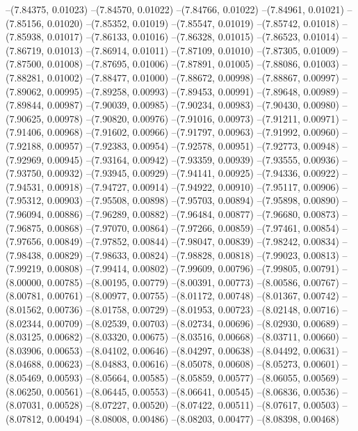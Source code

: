 --(7.84375, 0.01023)
--(7.84570, 0.01022)
--(7.84766, 0.01022)
--(7.84961, 0.01021)
--(7.85156, 0.01020)
--(7.85352, 0.01019)
--(7.85547, 0.01019)
--(7.85742, 0.01018)
--(7.85938, 0.01017)
--(7.86133, 0.01016)
--(7.86328, 0.01015)
--(7.86523, 0.01014)
--(7.86719, 0.01013)
--(7.86914, 0.01011)
--(7.87109, 0.01010)
--(7.87305, 0.01009)
--(7.87500, 0.01008)
--(7.87695, 0.01006)
--(7.87891, 0.01005)
--(7.88086, 0.01003)
--(7.88281, 0.01002)
--(7.88477, 0.01000)
--(7.88672, 0.00998)
--(7.88867, 0.00997)
--(7.89062, 0.00995)
--(7.89258, 0.00993)
--(7.89453, 0.00991)
--(7.89648, 0.00989)
--(7.89844, 0.00987)
--(7.90039, 0.00985)
--(7.90234, 0.00983)
--(7.90430, 0.00980)
--(7.90625, 0.00978)
--(7.90820, 0.00976)
--(7.91016, 0.00973)
--(7.91211, 0.00971)
--(7.91406, 0.00968)
--(7.91602, 0.00966)
--(7.91797, 0.00963)
--(7.91992, 0.00960)
--(7.92188, 0.00957)
--(7.92383, 0.00954)
--(7.92578, 0.00951)
--(7.92773, 0.00948)
--(7.92969, 0.00945)
--(7.93164, 0.00942)
--(7.93359, 0.00939)
--(7.93555, 0.00936)
--(7.93750, 0.00932)
--(7.93945, 0.00929)
--(7.94141, 0.00925)
--(7.94336, 0.00922)
--(7.94531, 0.00918)
--(7.94727, 0.00914)
--(7.94922, 0.00910)
--(7.95117, 0.00906)
--(7.95312, 0.00903)
--(7.95508, 0.00898)
--(7.95703, 0.00894)
--(7.95898, 0.00890)
--(7.96094, 0.00886)
--(7.96289, 0.00882)
--(7.96484, 0.00877)
--(7.96680, 0.00873)
--(7.96875, 0.00868)
--(7.97070, 0.00864)
--(7.97266, 0.00859)
--(7.97461, 0.00854)
--(7.97656, 0.00849)
--(7.97852, 0.00844)
--(7.98047, 0.00839)
--(7.98242, 0.00834)
--(7.98438, 0.00829)
--(7.98633, 0.00824)
--(7.98828, 0.00818)
--(7.99023, 0.00813)
--(7.99219, 0.00808)
--(7.99414, 0.00802)
--(7.99609, 0.00796)
--(7.99805, 0.00791)
--(8.00000, 0.00785)
--(8.00195, 0.00779)
--(8.00391, 0.00773)
--(8.00586, 0.00767)
--(8.00781, 0.00761)
--(8.00977, 0.00755)
--(8.01172, 0.00748)
--(8.01367, 0.00742)
--(8.01562, 0.00736)
--(8.01758, 0.00729)
--(8.01953, 0.00723)
--(8.02148, 0.00716)
--(8.02344, 0.00709)
--(8.02539, 0.00703)
--(8.02734, 0.00696)
--(8.02930, 0.00689)
--(8.03125, 0.00682)
--(8.03320, 0.00675)
--(8.03516, 0.00668)
--(8.03711, 0.00660)
--(8.03906, 0.00653)
--(8.04102, 0.00646)
--(8.04297, 0.00638)
--(8.04492, 0.00631)
--(8.04688, 0.00623)
--(8.04883, 0.00616)
--(8.05078, 0.00608)
--(8.05273, 0.00601)
--(8.05469, 0.00593)
--(8.05664, 0.00585)
--(8.05859, 0.00577)
--(8.06055, 0.00569)
--(8.06250, 0.00561)
--(8.06445, 0.00553)
--(8.06641, 0.00545)
--(8.06836, 0.00536)
--(8.07031, 0.00528)
--(8.07227, 0.00520)
--(8.07422, 0.00511)
--(8.07617, 0.00503)
--(8.07812, 0.00494)
--(8.08008, 0.00486)
--(8.08203, 0.00477)
--(8.08398, 0.00468)
